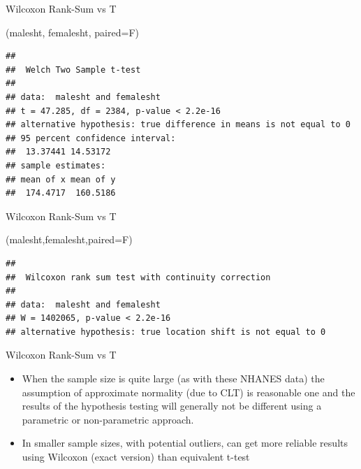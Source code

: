 \documentclass[
  ignorenonframetext,
  aspectratio=169]{beamer}
\newenvironment{Shaded}{\begin{snugshade}}{\end{snugshade}}
\newcommand{\AttributeTok}[1]{\textcolor[rgb]{0.13,0.29,0.53}{#1}}
\newcommand{\FunctionTok}[1]{\textcolor[rgb]{0.13,0.29,0.53}{\textbf{#1}}}
\newcommand{\NormalTok}[1]{#1}
\providecommand{\tightlist}{%
  \setlength{\itemsep}{0pt}\setlength{\parskip}{0pt}}
\renewcommand{\textbf}{\structure}
\begin{document}
\begin{frame}[fragile]{Wilcoxon Rank-Sum vs T}
\protect\hypertarget{wilcoxon-rank-sum-vs-t-1}{}
\begin{Shaded}
\begin{Highlighting}[]
\FunctionTok{t.test}\NormalTok{(malesht, femalesht, }\AttributeTok{paired=}\NormalTok{F)}
\end{Highlighting}
\end{Shaded}

\begin{verbatim}
## 
##  Welch Two Sample t-test
## 
## data:  malesht and femalesht
## t = 47.285, df = 2384, p-value < 2.2e-16
## alternative hypothesis: true difference in means is not equal to 0
## 95 percent confidence interval:
##  13.37441 14.53172
## sample estimates:
## mean of x mean of y 
##  174.4717  160.5186
\end{verbatim}
\end{frame}

\begin{frame}[fragile]{Wilcoxon Rank-Sum vs T}
\protect\hypertarget{wilcoxon-rank-sum-vs-t-2}{}
\begin{Shaded}
\begin{Highlighting}[]
\FunctionTok{wilcox.test}\NormalTok{(malesht,femalesht,}\AttributeTok{paired=}\NormalTok{F)}
\end{Highlighting}
\end{Shaded}

\begin{verbatim}
## 
##  Wilcoxon rank sum test with continuity correction
## 
## data:  malesht and femalesht
## W = 1402065, p-value < 2.2e-16
## alternative hypothesis: true location shift is not equal to 0
\end{verbatim}
\end{frame}

\begin{frame}{Wilcoxon Rank-Sum vs T}
\protect\hypertarget{wilcoxon-rank-sum-vs-t-3}{}
\begin{itemize}
\tightlist
\item
  When the sample size is quite large (as with these NHANES data) the
  assumption of approximate normality (due to CLT) is reasonable one and
  the results of the hypothesis testing will generally not be different
  using a parametric or non-parametric approach.
\item
  In smaller sample sizes, with potential outliers, can get more
  reliable results using Wilcoxon (exact version) than equivalent t-test
\end{itemize}
\end{frame}
\end{document}
